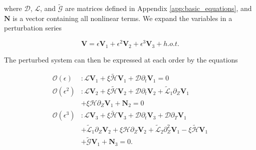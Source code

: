 \documentclass{emulateapj}
\newcommand{\beq}{\begin{equation}}
\newcommand{\eeq}{\end{equation}}
\begin{document}
where $\mathcal{D}$, $\mathcal{L}$, and $\widetilde{\mathcal{G}}$ are matrices defined in Appendix \ref{app:basic_equations}, and $\mathbf{N}$ is a vector containing all nonlinear terms. We expand the variables in a perturbation series 

\beq
\mathbf{V} = \epsilon \mathbf{V}_1 + \epsilon^2 \mathbf{V}_2 + \epsilon^3 \mathbf{V}_3 + h.o.t.
\eeq

 The perturbed system can then be expressed at each order by the equations

\begin{align}
\mathcal{O}(\epsilon)&: \mathcal{L} \mathbf{V}_1 + \xi \widetilde{\mathcal{H}} \mathbf{V}_1 + \mathcal{D} \partial_t \mathbf{V}_1 = 0 \label{eq:ordere}\\
\mathcal{O}(\epsilon^2)&: \mathcal{L} \mathbf{V}_2 + \xi \widetilde{\mathcal{H}} \mathbf{V}_2 + \mathcal{D} \partial_t \mathbf{V}_2 + \widetilde{\mathcal{L}}_1 \partial_Z \mathbf{V}_1 \nonumber\\
& + \xi \mathcal{H} \partial_Z \mathbf{V}_1 + \mathbf{N}_2 = 0 \label{eq:ordere2}\\
\mathcal{O}(\epsilon^3)&: \mathcal{L}\mathbf{V}_3 + \xi \widetilde{\mathcal{H}} \mathbf{V}_3 + \mathcal{D} \partial_t \mathbf{V}_3 + \mathcal{D} \partial_T \mathbf{V}_1 \nonumber\\
&+ \widetilde{\mathcal{L}}_1 \partial_Z \mathbf{V}_2 + \xi \mathcal{H}\partial_Z \mathbf{V}_2 + \widetilde{\mathcal{L}}_2 \partial_Z^2 \mathbf{V}_1 - \xi \widetilde{\mathcal{H}} \mathbf{V}_1 \nonumber\\
& + \widetilde{\mathcal{G}} \mathbf{V}_1 + \mathbf{N}_3 = 0.\label{eq:ordere3}
\end{align}
\end{document}
